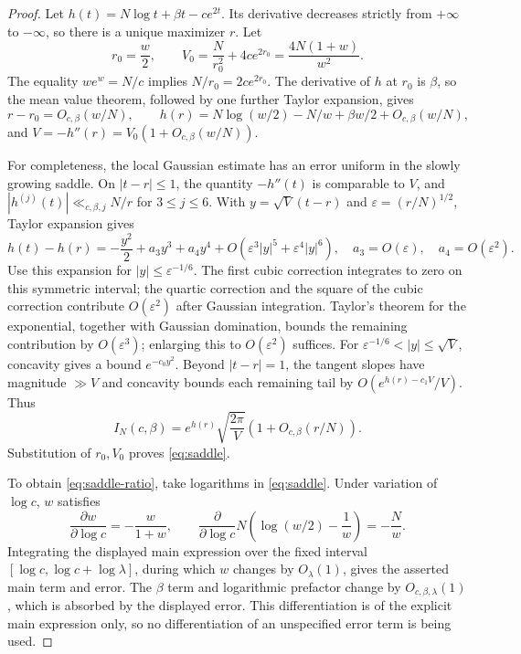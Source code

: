\documentclass[11pt]{article}
\begin{document}
\begin{proof}
Let $h(t)=N\log t+\beta t-ce^{2t}$. Its derivative decreases strictly from $+\infty$ to $-\infty$, so there is a unique maximizer $r$. Let
\[
 r_0=\frac w2,\qquad
 V_0=\frac{N}{r_0^2}+4ce^{2r_0}
 =\frac{4N(1+w)}{w^2}.
\]
The equality $we^w=N/c$ implies $N/r_0=2ce^{2r_0}$. The derivative of $h$ at $r_0$ is $\beta$, so the mean value theorem, followed by one further Taylor expansion, gives
\[
 r-r_0=O_{c,\beta}(w/N),\qquad
 h(r)=N\log(w/2)-N/w+\beta w/2+O_{c,\beta}(w/N),
\]
and $V=-h''(r)=V_0(1+O_{c,\beta}(w/N))$.

For completeness, the local Gaussian estimate has an error uniform in the slowly growing saddle. On $|t-r|\le1$, the quantity $-h''(t)$ is comparable to $V$, and $|h^{(j)}(t)|\ll_{c,\beta,j}N/r$ for $3\le j\le6$. With $y=\sqrt V(t-r)$ and $\varepsilon=(r/N)^{1/2}$, Taylor expansion gives
\[
 h(t)-h(r)=-\frac{y^2}{2}+a_3y^3+a_4y^4
 +O(\varepsilon^3|y|^5+\varepsilon^4|y|^6),
 \quad a_3=O(\varepsilon),\quad a_4=O(\varepsilon^2).
\]
Use this expansion for $|y|\le\varepsilon^{-1/6}$. The first cubic correction integrates to zero on this symmetric interval; the quartic correction and the square of the cubic correction contribute $O(\varepsilon^2)$ after Gaussian integration. Taylor's theorem for the exponential, together with Gaussian domination, bounds the remaining contribution by $O(\varepsilon^3)$; enlarging this to $O(\varepsilon^2)$ suffices. For $\varepsilon^{-1/6}<|y|\le\sqrt V$, concavity gives a bound $e^{-c_0y^2}$. Beyond $|t-r|=1$, the tangent slopes have magnitude $\gg V$ and concavity bounds each remaining tail by $O(e^{h(r)-c_1V}/V)$. Thus
\[
 I_N(c,\beta)=e^{h(r)}\sqrt{\frac{2\pi}{V}}
 \left(1+O_{c,\beta}(r/N)\right).
\]
Substitution of $r_0,V_0$ proves \eqref{eq:saddle}.

To obtain \eqref{eq:saddle-ratio}, take logarithms in \eqref{eq:saddle}. Under variation of $\log c$, $w$ satisfies
\[
 \frac{\partial w}{\partial\log c}=-\frac{w}{1+w},
 \qquad
 \frac{\partial}{\partial\log c}
 N\left(\log(w/2)-\frac1w\right)=-\frac Nw.
\]
Integrating the displayed main expression over the fixed interval $[\log c,\log c+\log\lambda]$, during which $w$ changes by $O_\lambda(1)$, gives the asserted main term and error. The $\beta$ term and logarithmic prefactor change by $O_{c,\beta,\lambda}(1)$, which is absorbed by the displayed error. This differentiation is of the explicit main expression only, so no differentiation of an unspecified error term is being used.
\end{proof}
\end{document}
